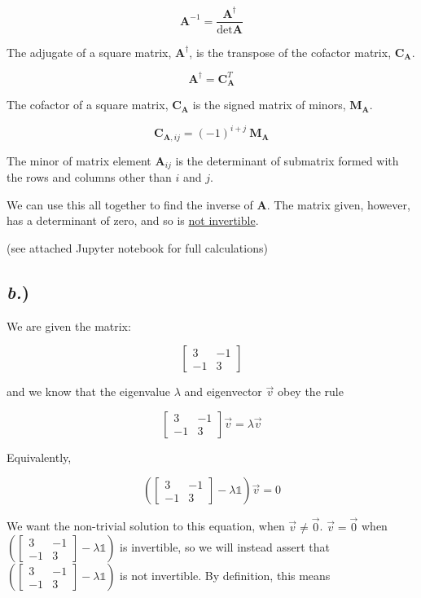 \documentclass{article}
\begin{document}
$$ \textbf{A}^{-1} = \frac{\textbf{A}^{\dagger}}{\det{\textbf{A}}} $$

The adjugate of a square matrix, $\textbf{A}^{\dagger}$, is the transpose of the cofactor matrix, $\textbf{C}_{\textbf{A}}$.

$$ \textbf{A}^{\dagger} = \textbf{C}_{\textbf{A}}^T $$

The cofactor of a square matrix, $\textbf{C}_{\textbf{A}}$ is the signed matrix of minors, $\textbf{M}_{\textbf{A}}$.

$$ \textbf{C}_{\textbf{A},ij} = (-1)^{i+j} \ \textbf{M}_{\textbf{A}} $$

The minor of matrix element $\textbf{A}_{ij}$ is the determinant of submatrix formed with the rows and columns other than $i$ and $j$.

We can use this all together to find the inverse of $\textbf{A}$. The matrix given, however, has a determinant of zero, and so is \underline{not invertible}.

(see attached Jupyter notebook for full calculations)


\subsection*{\textit{b.})}

We are given the matrix:

$$\begin{bmatrix}
3 	&	-1	\\
-1	&	3	\end{bmatrix}$$

and we know that the eigenvalue $\lambda$ and eigenvector $\vec{v}$ obey the rule

$$\begin{bmatrix}
3 	&	-1	\\
-1	&	3	\end{bmatrix}\vec{v} = \lambda \vec{v}$$

Equivalently, 

$$\left(\begin{bmatrix}
3 	&	-1	\\
-1	&	3	\end{bmatrix} - \lambda\mathbb{1}\right)\vec{v} = 0$$

We want the non-trivial solution to this equation, when $\vec{v} \neq \vec{0}$. $\vec{v} = \vec{0}$ when $\left(\begin{bmatrix}
3 	&	-1	\\
-1	&	3	\end{bmatrix} - \lambda\mathbb{1}\right)$ is invertible, so we will instead assert that $\left(\begin{bmatrix}
3 	&	-1	\\
-1	&	3	\end{bmatrix} - \lambda\mathbb{1}\right)$ is not invertible. By definition, this means 
\end{document}
